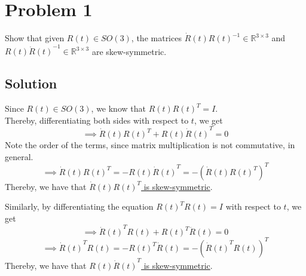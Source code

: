 \section*{Problem 1}

Show that given \( R(t) \in SO(3) \), the matrices \( \dot{R}(t) {R(t)}^{-1} \in \mathbb{R}^{3 \times 3} \) and \( R(t) {\dot{R}(t)}^{-1} \in \mathbb{R}^{3 \times 3} \) are skew-symmetric.

\subsection*{Solution}

Since \( R(t) \in SO(3) \), we know that \( R(t) {R(t)}^{T} = I \).\\
Thereby, differentiating both sides with respect to \( t \), we get
\begin{equation*}
    \implies
    \dot{R}(t) {R(t)}^{T}
    + R(t) {\dot{R}(t)}^{T}
    = 0
\end{equation*}
Note the order of the terms, since matrix multiplication is not commutative, in general.
\begin{equation*}
    \implies
    \dot{R}(t) {R(t)}^{T}
    =
    -R(t) {\dot{R}(t)}^{T}
    =
    - {\left( \dot{R}(t) {R(t)}^{T} \right)}^{T}
\end{equation*}
Thereby, we have that \underline{\( \dot{R}(t) {R(t)}^{T} \) is skew-symmetric}.

Similarly, by differentiating the equation \( {R(t)}^{T} R(t) = I \) with respect to \( t \), we get
\begin{equation*}
    \implies
    {\dot{R}(t)}^{T} R(t)
    + {R(t)}^{T} \dot{R}(t)
    = 0
\end{equation*}
\begin{equation*}
    \implies
    {\dot{R}(t)}^{T} R(t)
    =
    - {R(t)}^{T} \dot{R}(t)
    =
    - {\left( {\dot{R}(t)}^{T} R(t) \right)}^{T}
\end{equation*}
Thereby, we have that \underline{\( R(t) {\dot{R}(t)}^{T} \) is skew-symmetric}.
